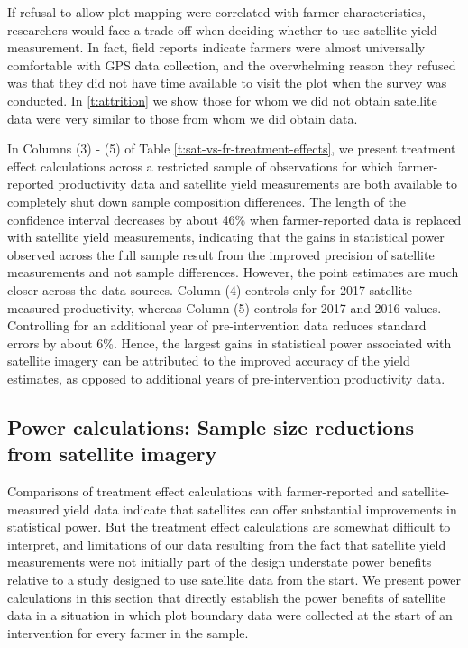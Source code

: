 \documentclass{article}
\begin{document}
If refusal to allow plot mapping were correlated with farmer characteristics, researchers would face a trade-off when deciding whether to use satellite yield measurement. In fact, field reports indicate farmers were almost universally comfortable with GPS data collection, and the overwhelming reason they refused was that they did not have time available to visit the plot when the survey was conducted. In \ref{t:attrition} we show those for whom we did not obtain satellite data were very similar to those from whom we did obtain data. 

In Columns (3) - (5) of Table \ref{t:sat-vs-fr-treatment-effects}, we present treatment effect calculations across a restricted sample of observations for which farmer-reported productivity data and satellite yield measurements are both available to completely shut down sample composition differences. The length of the confidence interval decreases by about 46\% when farmer-reported data is replaced with satellite yield measurements, indicating that the gains in statistical power observed across the full sample result from the improved precision of satellite measurements and not sample differences. However, the point estimates are much closer across the data sources. Column (4) controls only for 2017 satellite-measured productivity, whereas Column (5) controls for 2017 and 2016 values. Controlling for an additional year of pre-intervention data reduces standard errors by about 6\%. Hence, the largest gains in statistical power associated with satellite imagery can be attributed to the improved accuracy of the yield estimates, as opposed to additional years of pre-intervention productivity data.

\subsection{Power calculations: Sample size reductions from satellite imagery} \label{section:power}

Comparisons of treatment effect calculations with farmer-reported and satellite-measured yield data indicate that satellites can offer substantial improvements in statistical power. But the treatment effect calculations are somewhat difficult to interpret, and limitations of our data resulting from the fact that satellite yield measurements were not initially part of the design understate power benefits relative to a study designed to use satellite data from the start. We present power calculations in this section that directly establish the power benefits of satellite data in a situation in which plot boundary data were collected at the start of an intervention for every farmer in the sample. 
\end{document}
